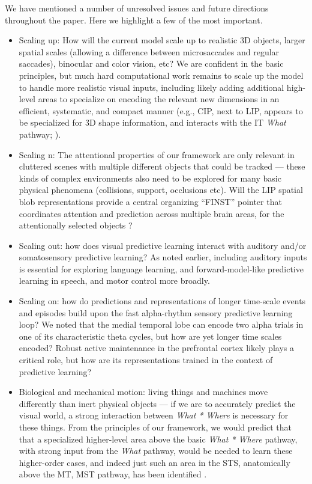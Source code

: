 \documentclass[11pt,twoside]{article}
\newif\myifpdf
\begin{document}
We have mentioned a number of unresolved issues and future directions throughout the paper. Here we highlight a few of the most important.
\begin{itemize}
\item Scaling up: How will the current model scale up to realistic 3D objects, larger spatial scales (allowing a difference between microsaccades and regular saccades), binocular and color vision, etc?  We are confident in the basic principles, but much hard computational work remains to scale up the model to handle more realistic visual inputs, including likely adding additional high-level areas to specialize on encoding the relevant new dimensions in an efficient, systematic, and compact manner (e.g., CIP, next to LIP, appears to be specialized for 3D shape information, and interacts with the IT {\em What} pathway; ).
\item Scaling n: The attentional properties of our framework are only relevant in cluttered scenes with multiple different objects that could be tracked --- these kinds of complex environments also need to be explored for many basic physical phenomena (collisions, support, occlusions etc).   Will the LIP spatial blob representations provide a central organizing ``FINST'' pointer that coordinates attention and prediction across multiple brain areas, for the attentionally selected objects \cite{Pylyshyn89,CavanaghHuntAfrazEtAl10,OReillyPetrovCohenEtAl14}?
\item Scaling out: how does visual predictive learning interact with auditory and/or somatosensory predictive learning?  As noted earlier, including auditory inputs is essential for exploring language learning, and forward-model-like predictive learning in speech, and motor control more broadly.
\item Scaling on: how do predictions and representations of longer time-scale events and episodes build upon the fast alpha-rhythm sensory predictive learning loop?  We noted that the medial temporal lobe can encode two alpha trials in one of its characteristic theta cycles, but how are yet longer time scales encoded?  Robust active maintenance in the prefrontal cortex likely plays a critical role, but how are its representations trained in the context of predictive learning?
\item Biological and mechanical motion: living things and machines move differently than inert physical objects --- if we are to accurately predict the visual world, a strong interaction between {\em What * Where} is necessary for these things.  From the principles of our framework, we would predict that that a specialized higher-level area above the basic {\em What * Where} pathway, with strong input from the {\em What} pathway, would be needed to learn these higher-order cases, and indeed just such an area in the STS, anatomically above the MT, MST pathway, has been identified \cite{PucePerrett03}.  

\end{itemize}
\end{document}
